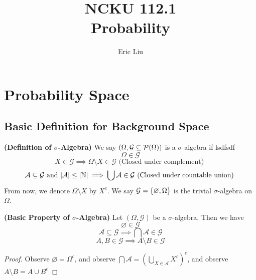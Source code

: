 \documentclass{report}
\title{\Huge{NCKU 112.1}\\Probability}
\author{\huge{Eric Liu}}
\date{}
\begin{document}
\maketitle
\newpage%
\tableofcontents
\pagebreak
\setcounter{chapter}{-1}

\chapter{Probability Space}
\section{Basic Definition for Background Space}
\begin{definition}
\label{0.1.1}
\textbf{(Definition of $\sigma$-Algebra)} We say  $(\Omega,\mathcal{G}\subseteq\mathcal{P}(\Omega))$ is a $\sigma$-algebra if 
lsdfsdf
\begin{equation}
\Omega \in\mathcal{G}
\end{equation}
\begin{equation}
X \in \mathcal{G}\implies \Omega \setminus X\in \mathcal{G} \text{ (Closed under complement) }
\end{equation}
\begin{equation}
\mathcal{A} \subseteq  \mathcal{G}\text{ and }|\mathcal{A}|\leq |\mathbb{N}|\implies \bigcup \mathcal{A}\in \mathcal{G}\text{ (Closed under countable union) }
\end{equation}
From now, we denote $\Omega\setminus X$ by $X^c$. We say $\mathcal{G}=\{ \varnothing,\Omega \}$ is the trivial $\sigma$-algebra on $\Omega$. 
\end{definition}
\begin{theorem}
\label{0.1.2}
\textbf{(Basic Property of $\sigma$-Algebra)} Let $(\Omega,\mathcal{G})$ be a $\sigma$-algebra. Then we have
\begin{equation}
\varnothing \in \mathcal{G}
\end{equation}
\begin{equation}
\mathcal{A}\subseteq \mathcal{G}\implies \bigcap \mathcal{A} \in \mathcal{G}
\end{equation}
\begin{equation}
A,B\in \mathcal{G}\implies A\setminus B \in \mathcal{G}
\end{equation}
\end{theorem}
\begin{proof}
Observe $\varnothing=\Omega^c$, and observe $\bigcap \mathcal{A}=(\bigcup_{X \in \mathcal{A}}X^c)^c$, and observe $A\setminus B=A\cup B^c$
\end{proof}
\end{document}
